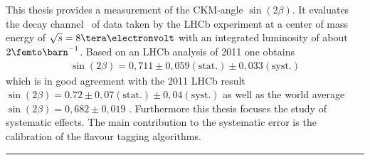 \section*{\abstractname}
This thesis provides a measurement of the CKM-angle $\sin(2\beta)$. It evaluates the decay channel \Decaychannel\ of data taken by the LHCb experiment at a center of mass energy of $\sqrt{s}=8\tera\electronvolt$ with an integrated luminosity of about $2\femto\barn^{-1}$. Based on an LHCb analysis of 2011 \cite{lhcb-paper} one obtains
\begin{align*}
\sin(2\beta) = 0,711 \pm 0,059(\text{stat.}) \pm 0,033(\text{syst.})
\end{align*}
which is in good agreement with the 2011 LHCb result $\sin(2\beta) = 0.72 \pm 0,07 (\text{stat.}) \pm 0,04 (\text{syst.})$ \cite{lhcb-paper} as well as the world average $\sin(2\beta) = 0,682 \pm 0,019$ \cite{pdg-average}. Furthermore this thesis focuses the study of systematic effects. The main contribution to the systematic error is the calibration of the flavour tagging algorithms. \\ \hrule





